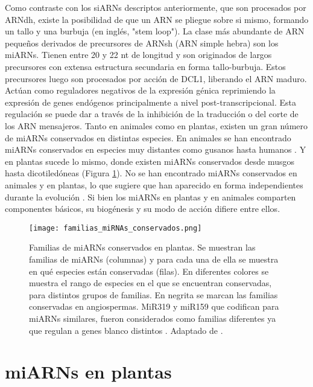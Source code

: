 Como contraste con los siARNs descriptos anteriormente, que son procesados por ARNdh, existe la posibilidad de que un ARN se pliegue sobre si mismo, formando un tallo y una burbuja (en inglés, "stem loop").
La clase más abundante de ARN pequeños derivados de precursores de ARNsh (ARN simple hebra) son los miARNs.
Tienen entre 20 y 22 nt de longitud y son originados de largos precursores con extensa estructura secundaria en forma tallo-burbuja.
Estos precursores luego son procesados por acción de DCL1, liberando el ARN maduro. 
Actúan como reguladores negativos de la expresión génica reprimiendo la expresión de genes endógenos principalmente a nivel post-transcripcional.
Esta regulación se puede dar a través de la inhibición de la traducción o del corte de los ARN mensajeros.
Tanto en animales como en plantas, existen un gran número de miARNs conservados en distintas especies.
En animales se han encontrado miARNs conservados en especies muy distantes como gusanos hasta humanos \citep{pmid11081512}.
Y en plantas sucede lo mismo, donde existen miARNs conservados desde musgos hasta dicotiledóneas \citep{pmid15849273,Axtell2008343,citeulike:8816489} (Figura \ref{fig:familias_miRNAs_conservados}).
No se han encontrado miARNs conservados en animales y en plantas, lo que sugiere que han aparecido en forma independientes durante la evolución \citep{citeulike:8816489}.
Si bien los miARNs en plantas y en animales comparten componentes básicos, su biogénesis y su modo de acción difiere entre ellos.


\begin{figure}[htbp!] 
    \centering    
    \texttt{[image: familias\_miRNAs\_conservados.png]}
    \caption[Familias de miARNs conservados en plantas]{
    Familias de miARNs conservados en plantas.
    Se muestran las familias de miARNs (columnas) y para cada una de ella se muestra en qué especies están conservadas (filas).
    En diferentes colores se muestra el rango de especies en el que se encuentran conservadas, para distintos grupos de familias.
    En negrita se marcan las familias conservadas en angiospermas. 
    MiR319 y miR159 que codifican para miARNs similares, fueron considerados como familias diferentes ya que regulan a genes blanco distintos \citep{Palatnik2007}.
    Adaptado de \citep{citeulike:8816489}.
    }
    \label{fig:familias_miRNAs_conservados}
\end{figure}

\section{miARNs en plantas}

